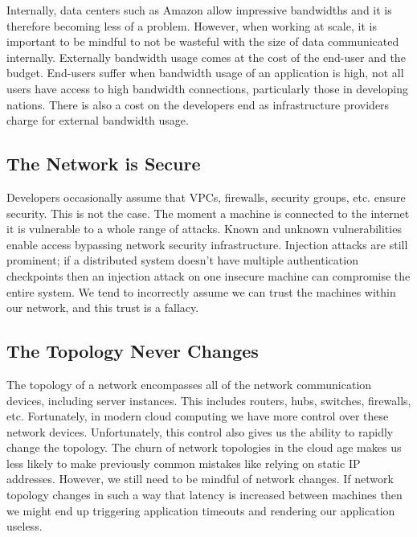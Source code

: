 Internally, data centers such as Amazon allow impressive bandwidths and it is therefore becoming less of a problem.
However, when working at scale,
it is important to be mindful to not be wasteful with the size of data communicated internally.
Externally bandwidth usage comes at the cost of the end-user and the budget.
End-users suffer when bandwidth usage of an application is high,
not all users have access to high bandwidth connections, particularly those in developing nations.
There is also a cost on the developers end as infrastructure providers charge for external bandwidth usage.

\subsection{The Network is Secure}
Developers occasionally assume that VPCs, firewalls, security groups, etc. ensure security.
This is not the case.
The moment a machine is connected to the internet it is vulnerable to a whole range of attacks.
Known and unknown vulnerabilities enable access bypassing network security infrastructure.
Injection attacks are still prominent;
if a distributed system doesn't have multiple authentication checkpoints then an injection attack on one insecure machine can compromise the entire system.
We tend to incorrectly assume we can trust the machines within our network,
and this trust is a fallacy.

\subsection{The Topology Never Changes}
The topology of a network encompasses all of the network communication devices, including server instances.
This includes routers, hubs, switches, firewalls, etc.
Fortunately, in modern cloud computing we have more control over these network devices.
Unfortunately, this control also gives us the ability to rapidly change the topology.
The churn of network topologies in the cloud age makes us less likely to make previously common mistakes like relying on static IP addresses.
However, we still need to be mindful of network changes.
If network topology changes in such a way that latency is increased between machines then we might end up triggering application timeouts and rendering our application useless.


